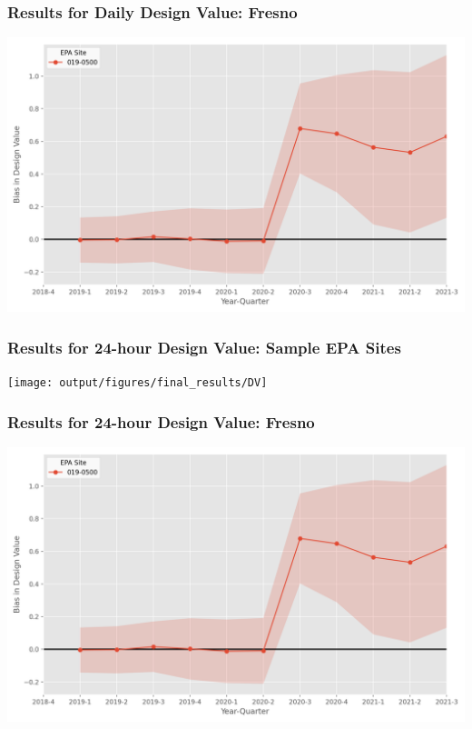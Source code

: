 \documentclass{beamer}
\begin{document}
\begin{frame}
\frametitle{Results for Daily Design Value: Fresno}


\includegraphics[width=\textwidth]{output/figures/final_results/DV_plot_site_019-0500.png}


\end{frame}


\begin{frame}
\frametitle{Results for 24-hour Design Value: Sample EPA Sites}
\texttt{[image: output/figures/final\_results/DV]}
\end{frame}


\begin{frame}
\frametitle{Results for 24-hour Design Value: Fresno}


\includegraphics[width=\textwidth]{output/figures/final_results/DV_plot_site_019-0500.png}


\end{frame}
\end{document}
